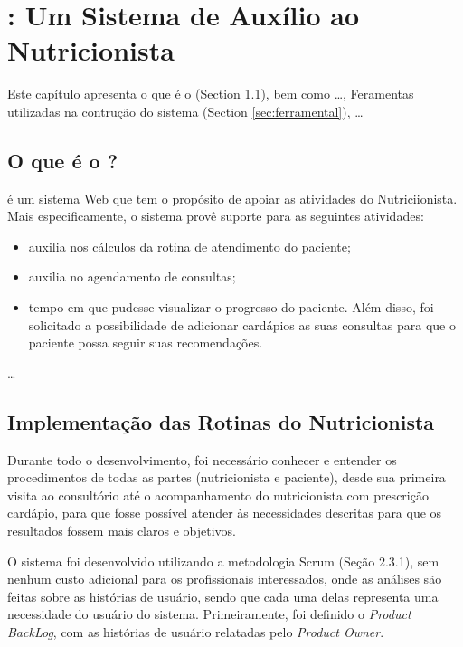 \chapter{: Um Sistema de Auxílio ao Nutricionista} \label{ch:sysnut}


{\color{red} Este capítulo apresenta o que é o \SysNut (Section \ref{sec:sysnut}), bem como \ldots, Feramentas utilizadas na contrução do sistema (Section \ref{sec:ferramental}), \ldots}  



\section{O que é o \SysNut?} \label{sec:sysnut}

\SysNut é um sistema Web que tem o propósito de apoiar as atividades do Nutriciionista. Mais especificamente, o sistema provê suporte para as seguintes atividades:

\begin{itemize}

\item auxilia nos cálculos da rotina de atendimento do paciente;
\item auxilia no agendamento de consultas;
\item {\color{red}tempo em que pudesse visualizar o progresso do paciente. Além disso, foi solicitado a possibilidade de adicionar cardápios as suas consultas para que o paciente possa seguir
suas recomendações.}

\end{itemize}
\ldots 



\section{Implementação das Rotinas do Nutricionista}

Durante todo o desenvolvimento, foi necessário conhecer e entender os
procedimentos de todas as partes (nutricionista e paciente), desde sua primeira visita
ao consultório até o acompanhamento do nutricionista com prescrição cardápio, para
que fosse possível atender às necessidades descritas para que os resultados
fossem mais claros e objetivos.

O sistema foi desenvolvido utilizando a metodologia Scrum (Seção 2.3.1), sem nenhum custo adicional
para os profissionais interessados, onde as análises são feitas sobre as histórias de usuário, sendo que cada uma delas
representa uma necessidade do usuário do sistema. Primeiramente, foi definido o
\textit{Product BackLog}, com as histórias de usuário relatadas pelo \textit{Product Owner}.

